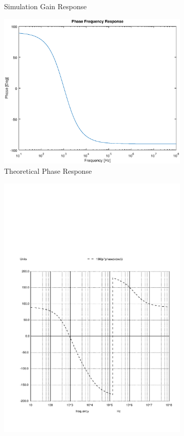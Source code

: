 \begin{figure}[h]
\begin{subfigure}{.5\textwidth}
    \caption{Simulation Gain Response}
\end{subfigure}
\begin{subfigure}{.5\textwidth}
    \centering
    \vspace{2.8 cm}
    \includegraphics[scale=0.4]{theo_phase_f_response.eps}
    \caption{Theoretical Phase Response}
\end{subfigure}%
\begin{subfigure}{.5\textwidth}
    \centering
    \includegraphics[scale=0.33]{voph.pdf}

\end{subfigure}
\end{figure}

